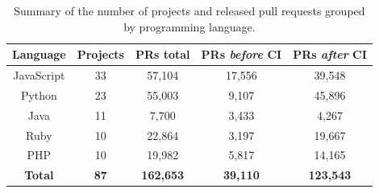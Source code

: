 \bgroup
\def\arraystretch{1.1}
\begin{table}[t]
	\centering
	\footnotesize
	\caption{Summary of the number of projects and released pull requests grouped by programming language.}
	\begin{tabular}{|c|c|c|c|c|}
		\hline
		\textbf{Language} & \textbf{Projects} & \textbf{PRs total}  & \textbf{PRs \textit{before} CI} & \textbf{PRs \textit{after} CI} \\
		\hline \hline
		JavaScript   & 33 & 57,104  & 17,556 & 39,548  \\ 
		Python       & 23 & 55,003 & 9,107 & 45,896  \\ 
		Java           & 11 & 7,700   & 3,433 & 4,267    \\ 
		Ruby          & 10 & 22,864 & 3,197 & 19,667  \\ 
		PHP            & 10 & 19,982 & 5,817 & 14,165  \\ 
		\hline
		\textbf{Total} & \textbf{87} & \textbf{162,653}  & \textbf{39,110} & \textbf{123,543} \\ 
		\hline
	\end{tabular}
	\label{tab:pulls_per_language}
\end{table}
\egroup

\bgroup
\def\arraystretch{1}

